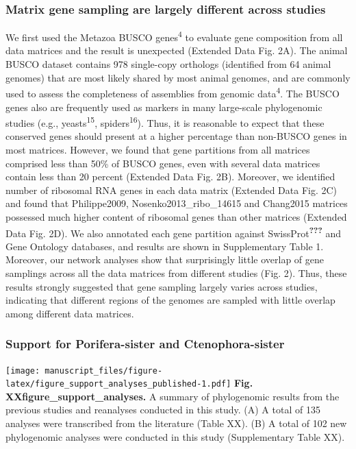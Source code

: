 \documentclass[]{article}
\begin{document}
\hypertarget{matrix-gene-sampling-are-largely-different-across-studies}{%
\subsubsection{Matrix gene sampling are largely different across
studies}\label{matrix-gene-sampling-are-largely-different-across-studies}}

We first used the Metazoa BUSCO genes\textsuperscript{4} to evaluate
gene composition from all data matrices and the result is unexpected
(Extended Data Fig. 2A). The animal BUSCO dataset contains 978
single-copy orthologs (identified from 64 animal genomes) that are most
likely shared by most animal genomes, and are commonly used to assess
the completeness of assemblies from genomic data\textsuperscript{4}. The
BUSCO genes also are frequently used as markers in many large-scale
phylogenomic studies (e.g., yeasts\textsuperscript{15},
spiders\textsuperscript{16}). Thus, it is reasonable to expect that
these conserved genes should present at a higher percentage than
non-BUSCO genes in most matrices. However, we found that gene partitions
from all matrices comprised less than 50\% of BUSCO genes, even with
several data matrices contain less than 20 percent (Extended Data Fig.
2B). Moreover, we identified number of ribosomal RNA genes in each data
matrix (Extended Data Fig. 2C) and found that Philippe2009,
Nosenko2013\_ribo\_14615 and Chang2015 matrices possessed much higher
content of ribosomal genes than other matrices (Extended Data Fig. 2D).
We also annotated each gene partition against
SwissProt\textsuperscript{{\textbf{???}}} and Gene Ontology databases,
and results are shown in Supplementary Table 1. Moreover, our network
analyses show that surprisingly little overlap of gene samplings across
all the data matrices from different studies (Fig. 2). Thus, these
results strongly suggested that gene sampling largely varies across
studies, indicating that different regions of the genomes are sampled
with little overlap among different data matrices.

\hypertarget{support-for-porifera-sister-and-ctenophora-sister}{%
\subsubsection{Support for Porifera-sister and
Ctenophora-sister}\label{support-for-porifera-sister-and-ctenophora-sister}}

\texttt{[image: manuscript\_files/figure-latex/figure\_support\_analyses\_published-1.pdf]}
\textbf{Fig. XXfigure\_support\_analyses.} A summary of phylogenomic
results from the previous studies and reanalyses conducted in this
study. (A) A total of 135 analyses were transcribed from the literature
(Table XX). (B) A total of 102 new phylogenomic analyses were conducted
in this study (Supplementary Table XX).
\end{document}
